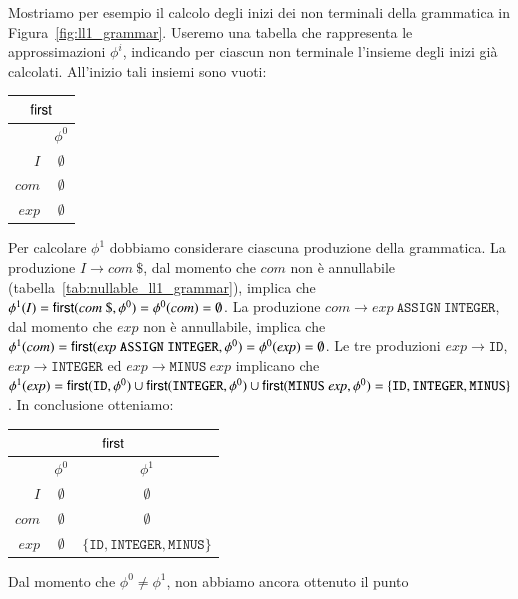 Mostriamo per esempio il calcolo degli inizi dei non terminali
della grammatica in Figura~\ref{fig:ll1_grammar}. Useremo una tabella
che rappresenta le approssimazioni $\phi^i$, indicando per ciascun
non terminale l'insieme degli inizi gi\`a calcolati. All'inizio tali insiemi
sono vuoti:
%
\begin{center}
\begin{tabular}{|r||c|}
\multicolumn{2}{c}{$\mathsf{first}$}\\\hline\hline
 & $\phi^0$ \\\hline
$I$ & $\emptyset$ \\\hline
$\mathit{com}$ & $\emptyset$ \\\hline
$\mathit{exp}$ & $\emptyset$\\\hline
\end{tabular}
\end{center}
%
Per calcolare $\phi^1$ dobbiamo considerare ciascuna produzione della
grammatica. La produzione $I\to\mathit{com}\ \mathtt{\$}$, dal momento
che $\mathit{com}$ non \`e annullabile
(tabella~\eqref{tab:nullable_ll1_grammar}), implica
che $\phi^1(\mathit{I})=\first(\mathit{com}\ \mathtt{\$},\phi^0)
=\phi^0(\mathit{com})=\emptyset$. La produzione
$\mathit{com}\to\mathit{exp}\ \mathtt{ASSIGN}\ \mathtt{INTEGER}$,
dal momento che $\mathit{exp}$ non \`e annullabile,
implica che $\phi^1(\mathit{com})=
\mathsf{first}(\mathit{exp}\ \mathtt{ASSIGN}\ \mathtt{INTEGER},\phi^0)=
\phi^0(\mathit{exp})=\emptyset$. Le tre produzioni
$\mathit{exp}\to\mathtt{ID}$, $\mathit{exp}\to\mathtt{INTEGER}$ ed
$\mathit{exp}\to\mathtt{MINUS}\ \mathit{exp}$ implicano che
$\phi^1(\mathit{exp})=\first(\mathtt{ID},\phi^0)\cup
\first(\mathtt{INTEGER},\phi^0)\cup\first(\mathtt{MINUS}\ \mathit{exp},\phi^0)
=\{\mathtt{ID},\mathtt{INTEGER},\mathtt{MINUS}\}$. In conclusione otteniamo:
%
\begin{center}
\begin{tabular}{|r||c|c|}
\multicolumn{3}{c}{$\mathsf{first}$}\\\hline\hline
 & $\phi^0$ & $\phi^1$ \\\hline
$I$ & $\emptyset$ & $\emptyset$ \\\hline
$\mathit{com}$ & $\emptyset$ & $\emptyset$ \\\hline
$\mathit{exp}$ & $\emptyset$ & $\{\mathtt{ID},\mathtt{INTEGER},
  \mathtt{MINUS}\}$\\\hline
\end{tabular}
\end{center}
%
Dal momento che $\phi^0\not=\phi^1$, non abbiamo ancora ottenuto il punto
